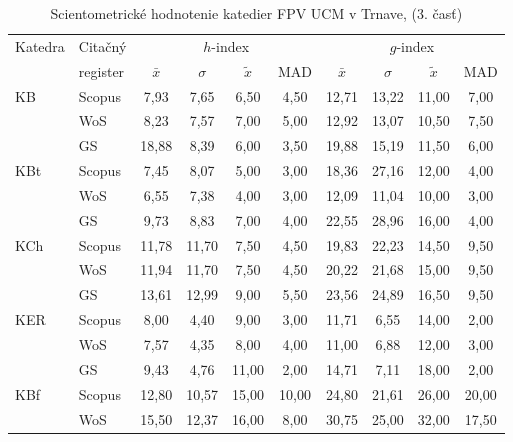 \begin{table}
  \centering\small
  \caption[Hodnotenie FPV\,--\,$h$-index a $h$-index]{Scientometrické hodnotenie katedier FPV UCM v Trnave, (3. časť)}
\label{tab:3-staff.results}
\begin{tabular}{llcccccccc}
  \toprule\noalign{\vspace{.3ex}}
  Katedra & Citačný  & \multicolumn{4}{c}{$h$-index}     & \multicolumn{4}{c}{$g$-index}    \\
       & register & $\bar{x}$      & $\sigma$  & $\tilde{x}$ & MAD  & $\bar{x}$      & $\sigma$  & $\tilde{x}$  & MAD  \\[0.3ex]
  \midrule\noalign{\vspace{.5ex}}                                                                                                                         
 KB   & Scopus & 7,93    & 7,65  & 6,50  & 4,50  & 12,71   & 13,22 & 11,00 & 7,00  \\
      & WoS    & 8,23    & 7,57  & 7,00  & 5,00  & 12,92   & 13,07 & 10,50 & 7,50  \\
      & GS     & 18,88   & 8,39  & 6,00  & 3,50  & 19,88   & 15,19 & 11,50 & 6,00  \\[1ex]
 KBt  & Scopus & 7,45    & 8,07  & 5,00  & 3,00  & 18,36   & 27,16 & 12,00 & 4,00  \\
      & WoS    & 6,55    & 7,38  & 4,00  & 3,00  & 12,09   & 11,04 & 10,00 & 3,00  \\
      & GS     & 9,73    & 8,83  & 7,00  & 4,00  & 22,55   & 28,96 & 16,00 & 4,00  \\[1ex]
 KCh  & Scopus & 11,78   & 11,70 & 7,50  & 4,50  & 19,83   & 22,23 & 14,50 & 9,50  \\
      & WoS    & 11,94   & 11,70 & 7,50  & 4,50  & 20,22   & 21,68 & 15,00 & 9,50  \\
      & GS     & 13,61   & 12,99 & 9,00  & 5,50  & 23,56   & 24,89 & 16,50 & 9,50  \\[1ex]
 KER  & Scopus & 8,00    & 4,40  & 9,00  & 3,00  & 11,71   & 6,55  & 14,00 & 2,00  \\
      & WoS    & 7,57    & 4,35  & 8,00  & 4,00  & 11,00   & 6,88  & 12,00 & 3,00  \\
      & GS     & 9,43    & 4,76  & 11,00 & 2,00  & 14,71   & 7,11  & 18,00 & 2,00  \\[1ex]
 KBf  & Scopus & 12,80   & 10,57 & 15,00 & 10,00 & 24,80   & 21,61 & 26,00 & 20,00 \\
      & WoS    & 15,50   & 12,37 & 16,00 & 8,00  & 30,75   & 25,00 & 32,00 & 17,50 \\

\end{tabular}
\end{table}
